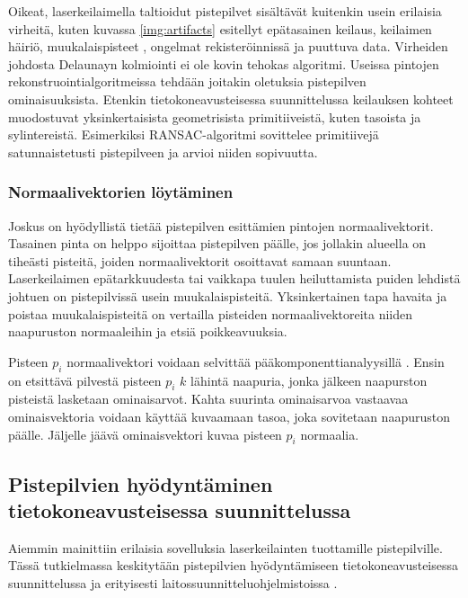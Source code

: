 Oikeat, laserkeilaimella taltioidut pistepilvet sisältävät kuitenkin usein erilaisia virheitä, kuten kuvassa \ref{img:artifacts} esitellyt epätasainen keilaus, keilaimen häiriö, muukalaispisteet , ongelmat rekisteröinnissä ja puuttuva data. Virheiden johdosta Delaunayn kolmiointi ei ole kovin tehokas algoritmi. Useissa pintojen rekonstruointialgoritmeissa tehdään joitakin oletuksia pistepilven ominaisuuksista. Etenkin tietokoneavusteisessa suunnittelussa keilauksen kohteet muodostuvat yksinkertaisista geometrisista primitiiveistä, kuten tasoista ja sylintereistä. Esimerkiksi RANSAC-algoritmi \cite{ransac} sovittelee primitiivejä satunnaistetusti pistepilveen ja arvioi niiden sopivuutta. \cite{berger} 

\subsubsection{Normaalivektorien löytäminen}

Joskus on hyödyllistä tietää pistepilven esittämien pintojen normaalivektorit. Tasainen pinta on helppo sijoittaa pistepilven päälle, jos jollakin alueella on tiheästi pisteitä, joiden normaalivektorit osoittavat samaan suuntaan. Laserkeilaimen epätarkkuudesta tai vaikkapa tuulen heiluttamista puiden lehdistä johtuen on pistepilvissä usein muukalaispisteitä. Yksinkertainen tapa havaita ja poistaa muukalaispisteitä on vertailla pisteiden normaalivektoreita niiden naapuruston normaaleihin ja etsiä poikkeavuuksia. 

Pisteen $p_i$ normaalivektori voidaan selvittää pääkomponenttianalyysillä . Ensin on etsittävä pilvestä pisteen $p_i$ $k$ lähintä naapuria, jonka jälkeen naapurston pisteistä lasketaan ominaisarvot. Kahta suurinta ominaisarvoa vastaavaa ominaisvektoria voidaan käyttää kuvaamaan tasoa, joka sovitetaan naapuruston päälle. Jäljelle jäävä ominaisvektori kuvaa pisteen $p_i$ normaalia. \cite{huang}

\subsection{Pistepilvien hyödyntäminen tietokoneavusteisessa suunnittelussa}

Aiemmin mainittiin erilaisia sovelluksia laserkeilainten tuottamille pistepilville. Tässä tutkielmassa keskitytään pistepilvien hyödyntämiseen tietokoneavusteisessa suunnittelussa  ja erityisesti laitossuunnitteluohjelmistoissa .

